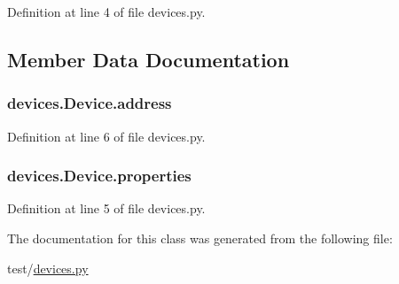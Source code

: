 Definition at line 4 of file devices.\+py.



\subsection{Member Data Documentation}
\subsubsection[{\texorpdfstring{address}{address}}]{\setlength{\rightskip}{0pt plus 5cm}devices.\+Device.\+address}\hypertarget{classdevices_1_1_device_a4d849fa1ec90eca6deb547d26e54112f}{}\label{classdevices_1_1_device_a4d849fa1ec90eca6deb547d26e54112f}


Definition at line 6 of file devices.\+py.

\subsubsection[{\texorpdfstring{properties}{properties}}]{\setlength{\rightskip}{0pt plus 5cm}devices.\+Device.\+properties}\hypertarget{classdevices_1_1_device_aa57c7eb94fb4523d48bf9e85efa7d3a4}{}\label{classdevices_1_1_device_aa57c7eb94fb4523d48bf9e85efa7d3a4}


Definition at line 5 of file devices.\+py.



The documentation for this class was generated from the following file\+:\begin{DoxyCompactItemize}
\item 
test/\hyperlink{devices_8py}{devices.\+py}\end{DoxyCompactItemize}
